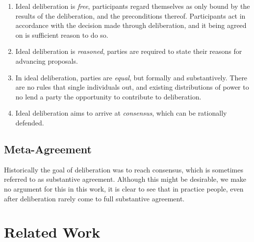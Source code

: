\begin{enumerate}
	\label{list:ideal-deliberation}
	\setlength\itemsep{1px}
	\item  Ideal deliberation is \textit{free}, participants regard themselves as only bound by the results of the deliberation, and the preconditions thereof. Participants act in accordance with the decision made through deliberation, and it being agreed on is sufficient reason to do so.
	\item  Ideal deliberation is \textit{reasoned}, parties are required to state their reasons for advancing proposals.
	\item  In ideal deliberation, parties are \textit{equal}, but formally and substantively. There are no rules that single individuals out, and existing distributions of power to no lend a party the opportunity to contribute to deliberation.
	\item  Ideal deliberation aims to arrive at \textit{consensus}, which can be rationally defended. 
\end{enumerate}

\subsection{Meta-Agreement}
Historically the goal of deliberation was to reach consensus, which is sometimes referred to as substantive agreement. Although this might be desirable, we make no argument for this in this work, it is clear to see that in practice people, even after deliberation rarely come to full substantive agreement. \citet{List_2002}


\section{Related Work}










